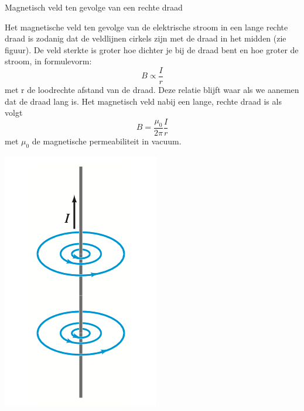 \begin{theo}{Magnetisch veld ten gevolge van een rechte draad}
    \begin{minipage}{0.87\textwidth}
        Het magnetische veld ten gevolge van de elektrische stroom in een lange rechte draad is zodanig dat de
        veldlijnen cirkels zijn met de draad in het midden (zie figuur). De veld sterkte is groter hoe dichter je bij de
        draad bent en hoe groter de stroom, in formulevorm:
        \begin{equation*}
            B \propto \dfrac{I}{r}
        \end{equation*}
        met r de loodrechte afstand van de draad. Deze relatie blijft waar als we aanemen dat de draad lang is.
        Het magnetisch veld nabij een lange, rechte draad is als volgt
        \begin{equation*}
            B = \dfrac{\mu_0}{2\pi}\dfrac{I}{r}
        \end{equation*}
        met $\mu_0$ de magnetische permeabiliteit in vacuum.
    \end{minipage}
    \begin{minipage}{.09\textwidth}
        \includegraphics[scale=0.225]{Images/Magnetisme/MagnetischVeldTenGevolgeRechteDraad}
    \end{minipage}
\end{theo}

